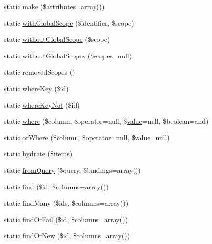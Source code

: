 \begin{DoxyCompactItemize}
\item 
static \mbox{\hyperlink{class_eloquent_a9987d6aaba201b36451caaea8065c7e4}{make}} (\$attributes=array())
\item 
static \mbox{\hyperlink{class_eloquent_a061c1fd5ab3d8e4e497f5e96a90d4ae3}{with\+Global\+Scope}} (\$identifier, \$scope)
\item 
static \mbox{\hyperlink{class_eloquent_a47d5d4f0f7be1ee5db65013ef9b79908}{without\+Global\+Scope}} (\$scope)
\item 
static \mbox{\hyperlink{class_eloquent_a65043ab2772d0ad732a64602fd6c3e2f}{without\+Global\+Scopes}} (\$\mbox{\hyperlink{class_eloquent_a30187b0aba1d255c83ca54ade893942a}{scopes}}=null)
\item 
static \mbox{\hyperlink{class_eloquent_a91d9856422b9e0ef6ea89683e6bca894}{removed\+Scopes}} ()
\item 
static \mbox{\hyperlink{class_eloquent_a99288a406c5f9d209b951ea47b09c900}{where\+Key}} (\$id)
\item 
static \mbox{\hyperlink{class_eloquent_aa270e04797f3bcd3e062ddbcbb9df59a}{where\+Key\+Not}} (\$id)
\item 
static \mbox{\hyperlink{class_eloquent_a73746da2a8ac07c59c577acde0606d5d}{where}} (\$column, \$operator=null, \$\mbox{\hyperlink{class_eloquent_a653061eb837042f61e82447886e15a72}{value}}=null, \$boolean=\textquotesingle{}and\textquotesingle{})
\item 
static \mbox{\hyperlink{class_eloquent_a24dd07936a2d5bfa885be38cf82ecb7a}{or\+Where}} (\$column, \$operator=null, \$\mbox{\hyperlink{class_eloquent_a653061eb837042f61e82447886e15a72}{value}}=null)
\item 
static \mbox{\hyperlink{class_eloquent_a4898fa742bed182f7ce97fc3301a10b2}{hydrate}} (\$items)
\item 
static \mbox{\hyperlink{class_eloquent_a5b042d9f31bce4d9423bcd5cee19e541}{from\+Query}} (\$query, \$bindings=array())
\item 
static \mbox{\hyperlink{class_eloquent_ab6ef1f841da5e0d7853767d5a35eff41}{find}} (\$id, \$columns=array())
\item 
static \mbox{\hyperlink{class_eloquent_a09565e061d998ef7b435f8b7c89af7f9}{find\+Many}} (\$ids, \$columns=array())
\item 
static \mbox{\hyperlink{class_eloquent_a5c4e81f02d09cebec4ea283bb2d14ac7}{find\+Or\+Fail}} (\$id, \$columns=array())
\item 
static \mbox{\hyperlink{class_eloquent_a5b2fd22847f1ae9772ea88792808e06b}{find\+Or\+New}} (\$id, \$columns=array())

\end{DoxyCompactItemize}
